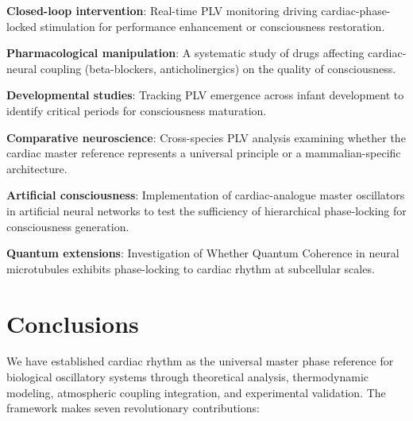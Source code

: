 \documentclass[12pt]{article}
\theoremstyle{remark}
\begin{document}
\textbf{Closed-loop intervention}: Real-time PLV monitoring driving cardiac-phase-locked stimulation for performance enhancement or consciousness restoration.

\textbf{Pharmacological manipulation}: A systematic study of drugs affecting cardiac-neural coupling (beta-blockers, anticholinergics) on the quality of consciousness.

\textbf{Developmental studies}: Tracking PLV emergence across infant development to identify critical periods for consciousness maturation.

\textbf{Comparative neuroscience}: Cross-species PLV analysis examining whether the cardiac master reference represents a universal principle or a mammalian-specific architecture.

\textbf{Artificial consciousness}: Implementation of cardiac-analogue master oscillators in artificial neural networks to test the sufficiency of hierarchical phase-locking for consciousness generation.

\textbf{Quantum extensions}: Investigation of Whether Quantum Coherence in neural microtubules exhibits phase-locking to cardiac rhythm at subcellular scales.

\section{Conclusions}

We have established cardiac rhythm as the universal master phase reference for biological oscillatory systems through theoretical analysis, thermodynamic modeling, atmospheric coupling integration, and experimental validation. The framework makes seven revolutionary contributions:
\end{document}
